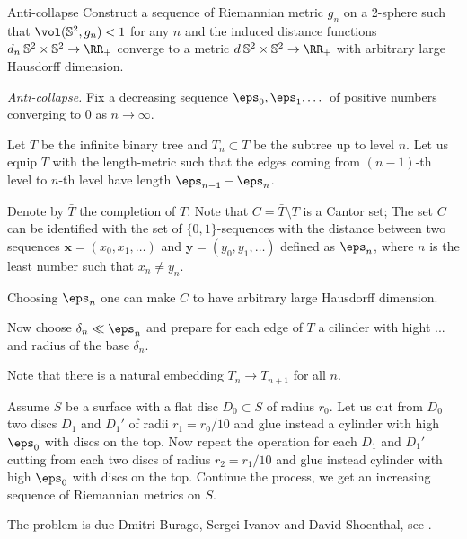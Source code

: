 \begin{pr}{}{Anti-collapse}\label{anti-collaps} Construct
a sequence of Riemannian metric $g_n$ on a 2-sphere such that 
$\vol (\mathbb S^2,g_n)<1$ for any $n$ 
and the induced distance functions $d_n\:\mathbb{S}^2\times \mathbb{S}^2\to \RR_+$
converge to a metric $d\:\mathbb{S}^2\times \mathbb{S}^2\to \RR_+$ 
with arbitrary large Hausdorff dimension.
\end{pr}

\textit{Anti-collapse.}
Fix a decreasing sequence $\eps_0,\eps_1,\dots$ of positive numbers converging to $0$ as $n\to \infty$.

Let $T$ be the infinite binary tree
and $T_n\subset T$ be the subtree up to level $n$.
Let us equip $T$ with the length-metric such that the edges coming from $(n-1)$-th level to $n$-th level have length $\eps_{n-1}-\eps_n$.

Denote by $\bar T$ the completion of $T$.
Note that $C=\bar T\setminus T$ is a Cantor set;
The set $C$ can be identified with the set of $\{0,1\}$-sequences 
with the distance between two sequences $\bm{x}=(x_0,x_1,\dots)$ and $\bm{y}=(y_0,y_1,\dots)$ defined as $\eps_n$, where $n$ is the least number such that $x_n\ne y_n$.

Choosing $\eps_n$ one can make $C$ to have arbitrary large Hausdorff dimension.

Now choose $\delta_n\ll\eps_n$ and prepare for each edge of $T$ a cilinder with hight ... and radius of the base $\delta_n$.
 

Note that there is a natural embedding $T_{n}\to T_{n+1}$ for all $n$.


Assume $S$ be a surface with a flat disc $D_0\subset S$ of radius $r_0$.
Let us cut from $D_0$ two discs $D_1$ and $D_1'$ 
of radii $r_1=r_0/10$ and glue instead a cylinder with high $\eps_0$ 
with discs on the top.
Now repeat the operation for each $D_1$ and $D_1'$ cutting 
from each two discs of radius $r_2=r_1/10$
and glue instead cylinder with high $\eps_0$ 
with discs on the top.
Continue the process, we get an increasing sequence of Riemannian metrics on $S$.

The problem is due
Dmitri Burago, 
Sergei Ivanov 
and David Shoenthal,
see \cite{BIS}.














